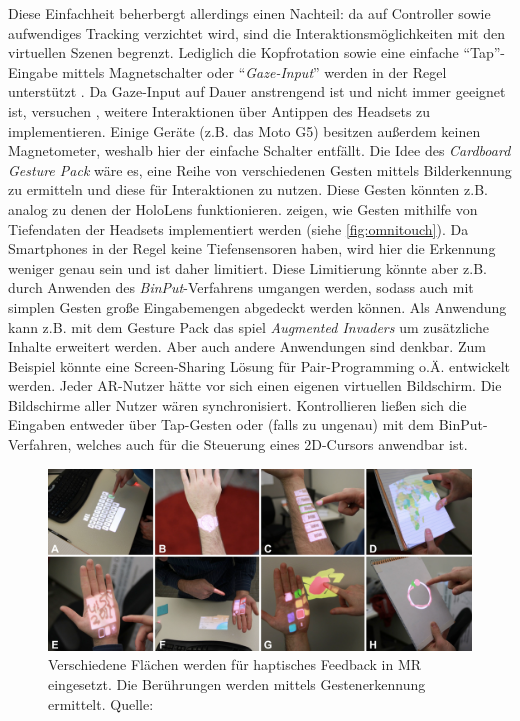 \documentclass[a4paper]{scrartcl}
\begin{document}
Diese Einfachheit beherbergt allerdings einen Nachteil:
da auf Controller sowie aufwendiges Tracking verzichtet wird, sind die Interaktionsmöglichkeiten mit den virtuellen Szenen begrenzt.
Lediglich die Kopfrotation sowie eine einfache \enquote{Tap}-Eingabe mittels Magnetschalter oder \enquote{\emph{Gaze-Input}} werden in der Regel unterstützt \parencite[vgl.][]{Yoo2015}.
Da Gaze-Input auf Dauer anstrengend ist und nicht immer geeignet ist, versuchen \textcite{Yan2016}, weitere Interaktionen über Antippen des Headsets zu implementieren.
Einige Geräte (z.B. das Moto G5) besitzen außerdem keinen Magnetometer, weshalb hier der einfache Schalter entfällt.
Die Idee des \emph{Cardboard Gesture Pack} wäre es, eine Reihe von verschiedenen Gesten mittels Bilderkennung zu ermitteln und diese für Interaktionen zu nutzen.
Diese Gesten könnten z.B. analog zu denen der HoloLens funktionieren.
\textcites{Xiao2018}{Harrison2011} zeigen, wie Gesten mithilfe von Tiefendaten der Headsets implementiert werden (siehe \autoref{fig:omnitouch}).
Da Smartphones in der Regel keine Tiefensensoren haben, wird hier die Erkennung weniger genau sein und ist daher limitiert.
Diese Limitierung könnte aber z.B. durch Anwenden des \emph{BinPut}-Verfahrens \parencite{Todi2017} umgangen werden, sodass auch mit simplen Gesten große Eingabemengen abgedeckt werden können.
Als Anwendung kann z.B. mit dem Gesture Pack das spiel \emph{Augmented Invaders} um zusätzliche Inhalte erweitert werden.
Aber auch andere Anwendungen sind denkbar.
Zum Beispiel könnte eine Screen-Sharing Lösung für Pair-Programming o.Ä. entwickelt werden.
Jeder AR-Nutzer hätte vor sich einen eigenen virtuellen Bildschirm.
Die Bildschirme aller Nutzer wären synchronisiert.
Kontrollieren ließen sich die Eingaben entweder über Tap-Gesten oder (falls zu ungenau) mit dem BinPut-Verfahren, welches auch für die Steuerung eines 2D-Cursors anwendbar ist.

\begin{figure}[h]
	\centering
	\includegraphics[width=\textwidth]{figures/omnitouch.png}
	\caption{Verschiedene Flächen werden für haptisches Feedback in MR eingesetzt. Die Berührungen werden mittels Gestenerkennung ermittelt. Quelle: \autocite{Harrison2011}}
	\label{fig:omnitouch}
\end{figure}
\end{document}
